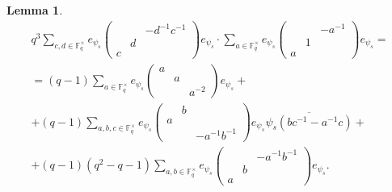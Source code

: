 \documentclass[12pt,reqno]{amsart}
\newtheorem{lem}[thm]{Lemma}
\theoremstyle{definition}
\theoremstyle{remark}
\numberwithin{equation}{section}
\begin{document}
\begin{lem}\label{B_4}
    \begin{multline*}
        q^3\sum_{c, d \in \mathbb{F}_q^\times} e_{\psi_s}
        \begin{pmatrix}
            & & -d^{-1}c^{-1}\\
            & d & \\
            c & &
        \end{pmatrix} e_{\psi_s} \cdot \sum_{a \in \mathbb{F}_q^\times} e_{\psi_s} \begin{pmatrix}
                & & -a^{-1}\\
                & 1 &\\
                a & &
            \end{pmatrix} e_{\psi_s} = \\ = (q-1)\sum_{a \in \mathbb{F}_q^\times} e_{\psi_s} \begin{pmatrix}
            a & & \\
            & a & \\
            & & a^{-2}
        \end{pmatrix}e_{\psi_s} + \\ + (q-1) \sum_{a, b, c \in \mathbb{F}_q^\times}e_{\psi_s} \begin{pmatrix}
            & b &\\
            a & &\\
            & & -a^{-1}b^{-1}
        \end{pmatrix}e_{\psi_s}\overline{\psi_s(bc^{-1}-a^{-1}c)}+\\+(q-1)(q^2-q-1) \sum_{a, b \in \mathbb{F}_q^\times} e_{\psi_s} \begin{pmatrix}
            & & -a^{-1}b^{-1} \\
            & b &\\
            a & &
        \end{pmatrix} e_{\psi_s}.
    \end{multline*}
\end{lem}
\end{document}
